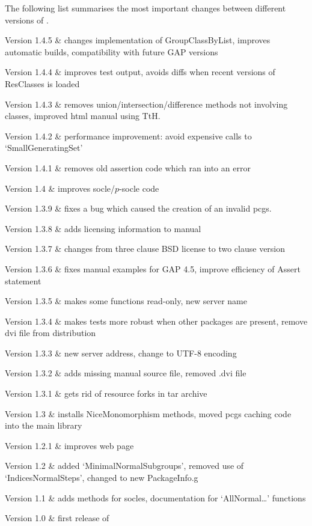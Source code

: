 
The following list summarises the most important changes between different versions of \CRISP.

\beginitems
Version 1.4.5 &
	changes implementation of GroupClassByList, improves automatic builds, compatibility with future GAP versions
	
Version  1.4.4 &
	improves test output, avoids diffs when recent versions of ResClasses is loaded

Version 1.4.3 &
	removes union/intersection/difference methods not involving classes, improved html manual using TtH.

Version 1.4.2 & 
	performance improvement: avoid expensive calls to `SmallGeneratingSet'
	
Version 1.4.1 &
	removes old assertion code which ran into an error
	
Version 1.4 &
	improves socle/$p$-socle code
	
Version 1.3.9 &
	fixes a bug which caused the creation of an invalid pcgs.
	
Version 1.3.8 &
	adds licensing information to manual
	
Version 1.3.7 &
	changes from three clause BSD license to two clause version
	
Version 1.3.6 & 
	fixes manual examples for GAP 4.5, improve efficiency of Assert statement
	
Version 1.3.5 &
	makes some functions read-only, new server name
	
Version 1.3.4 & 
	makes tests more robust when other packages are present, remove dvi file from distribution
	
Version 1.3.3 &	
	new server address, change to UTF-8 encoding
	
Version 1.3.2 &
	adds missing manual source file, removed .dvi file
	
Version 1.3.1 & 
	gets rid of resource forks in tar archive
	
Version 1.3	&
	installs NiceMonomorphism methods, moved pcgs caching code into the main {\GAP} library
	
Version 1.2.1	&
	improves web page
	
Version 1.2	&
	added `MinimalNormalSubgroups', removed use of `IndicesNormalSteps', changed to new PackageInfo.g 

Version 1.1 	& 
	adds methods for socles, documentation for `AllNormal\dots' functions
	
Version 1.0	&
	first release of {\CRISP}
	
\enditems

